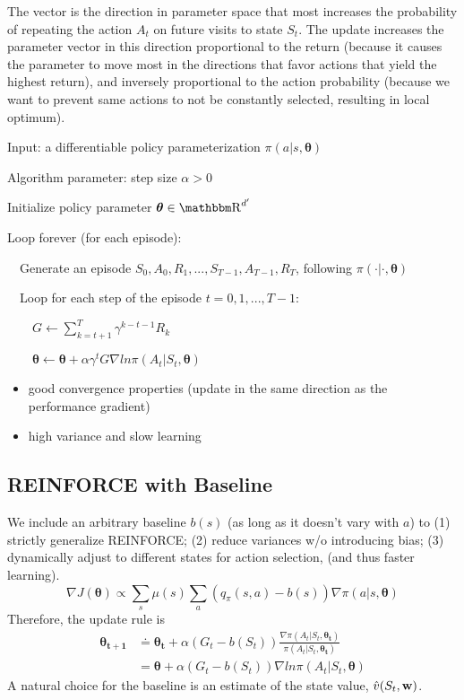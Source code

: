 \documentclass[sutton_barto_notes.tex]{subfiles}
\begin{document}
The vector is the direction in parameter space that most increases the probability of repeating the action $A_t$ on future visits to state $S_t$. The update increases the parameter vector in this direction proportional to the return (because it causes the parameter to move most in the directions that favor actions that yield the highest return), and inversely proportional to the action probability (because we want to prevent same actions to not be constantly selected, resulting in local optimum).

\begin{tcolorbox}[width=1.1\textwidth,title={REINFORCE: Monte-Carlo Policy-Gradient Control (episodic) for $\pi_*$}]
Input: a differentiable policy parameterization $\pi(a|s,\bm{\theta})$

Algorithm parameter: step size $\alpha > 0$

Initialize policy parameter $\bm{\theta} \in \R^{d'}$

Loop forever (for each episode):

$\quad$Generate an episode $S_0,A_0,R_1,...,S_{T-1},A_{T-1},R_T$, following $\pi(\cdot|\cdot,\bm{\theta})$

$\quad$Loop for each step of the episode $t=0,1,...,T-1$:

$\quad\quad G\leftarrow\sum_{k=t+1}^T \gamma^{k-t-1}R_k$

$\quad\quad\bm{\theta}\leftarrow\bm{\theta}+\alpha\gamma^t G \nabla ln\pi(A_t | S_t, \bm{\theta})$
\end{tcolorbox}

\begin{itemize}
\item good convergence properties (update in the same direction as the performance gradient)
\item high variance and slow learning
\end{itemize}

\subsection{REINFORCE with Baseline}

We include an arbitrary baseline $b(s)$ (as long as it doesn't vary with $a$) to (1) strictly generalize REINFORCE; (2) reduce variances w/o introducing bias; (3) dynamically adjust to different states for action selection, (and thus faster learning).
$$\nabla J(\bm{\theta}) \propto \sum_s\mu(s)\sum_a (q_\pi(s,a) - b(s))\nabla\pi(a|s,\bm{\theta})$$
Therefore, the update rule is
\begin{align*}
\bm{\theta_{t+1}} &\doteq \bm{\theta_t} + \alpha (G_t - b(S_t)) \frac{\nabla\pi(A_t|S_t,\bm{\theta_t})}{\pi(A_t|S_t,\bm{\theta_t})} \\
&= \bm{\theta} + \alpha (G_t - b(S_t)) \nabla ln \pi(A_t|S_t, \bm{\theta})
\end{align*}
A natural choice for the baseline is an estimate of the state value, $\hat{v}(S_t, {\operatorname*{\mathbf{w}}})$.
\end{document}
